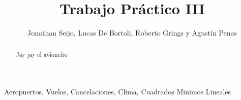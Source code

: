 \documentclass{endm}
\begin{document}
\begin{frontmatter}

\title{Trabajo Práctico III}

\author{Jonathan Seijo, Lucas De Bortoli, Roberto Grings y Agustín Penas}
\address{Departamento de computación\\ Universidad de Buenos Aires\\ Buenos Aires, Argentina}


\begin{abstract}
Jay jay el avioncito
\end{abstract}

\begin{keyword}
Aeropuertos, Vuelos, Cancelaciones, Clima, Cuadrados Minimos Lineales
\end{keyword}

\end{frontmatter}

\newpage


\newpage

\end{document}
